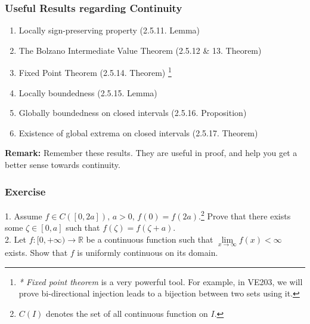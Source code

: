 \documentclass[10pt, t]{beamer}
\newcommand{\R}{\mathbb{R}}
\begin{document}
\begin{frame}
    \frametitle{Useful Results regarding Continuity}

    \begin{enumerate}
        \item Locally sign-preserving property (2.5.11. Lemma)
        \item The Bolzano Intermediate Value Theorem (2.5.12 \& 13. Theorem)
        \item Fixed Point Theorem (2.5.14. Theorem) \footnote[frame]{\textit{* Fixed point theorem} is a very powerful tool. For example, in VE203, we will prove bi-directional injection leads to a bijection between two sets using it.}
        \item Locally boundedness (2.5.15. Lemma)
        \item Globally boundedness on closed intervals (2.5.16. Proposition)
        \item Existence of global extrema on closed intervals (2.5.17. Theorem)
    \end{enumerate}
    \textbf{Remark:} Remember these results. They are useful in proof, and help you get a better sense towards continuity.
\end{frame}

\begin{frame}
    \frametitle{Exercise}

    1. Assume $f\in C([0,2a]),\, a>0,\, f(0)=f(2a).$\footnote[frame]{ $C(I)$ denotes the set of all continuous function on $I$.} Prove that there exists some $\zeta \in [0,a]$ such that $f(\zeta)=f(\zeta +a)$.\\
    \vspace{30pt}
    2. Let $f:[0,+\infty)\to \R$ be a continuous function such that $\underset{x\to\infty}{\lim}f(x)<\infty$ exists. Show that $f$ is uniformly continuous on its domain.
\end{frame}
\end{document}
